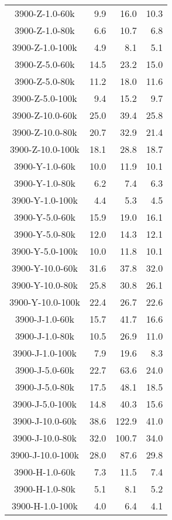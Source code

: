 \begin{longtable}{crrr}
    3900-Z-1.0-60k &   9.9 &   16.0 &  10.3 \\
    3900-Z-1.0-80k &   6.6 &   10.7 &   6.8 \\
    3900-Z-1.0-100k &   4.9 &    8.1 &   5.1 \\
    3900-Z-5.0-60k &  14.5 &   23.2 &  15.0 \\
    3900-Z-5.0-80k &  11.2 &   18.0 &  11.6 \\
    3900-Z-5.0-100k &   9.4 &   15.2 &   9.7 \\
    3900-Z-10.0-60k &  25.0 &   39.4 &  25.8 \\
    3900-Z-10.0-80k &  20.7 &   32.9 &  21.4 \\
    3900-Z-10.0-100k &  18.1 &   28.8 &  18.7 \\
    3900-Y-1.0-60k &  10.0 &   11.9 &  10.1 \\
    3900-Y-1.0-80k &   6.2 &    7.4 &   6.3 \\
    3900-Y-1.0-100k &   4.4 &    5.3 &   4.5 \\
    3900-Y-5.0-60k &  15.9 &   19.0 &  16.1 \\
    3900-Y-5.0-80k &  12.0 &   14.3 &  12.1 \\
    3900-Y-5.0-100k &  10.0 &   11.8 &  10.1 \\
    3900-Y-10.0-60k &  31.6 &   37.8 &  32.0 \\
    3900-Y-10.0-80k &  25.8 &   30.8 &  26.1 \\
    3900-Y-10.0-100k &  22.4 &   26.7 &  22.6 \\
    3900-J-1.0-60k &  15.7 &   41.7 &  16.6 \\
    3900-J-1.0-80k &  10.5 &   26.9 &  11.0 \\
    3900-J-1.0-100k &   7.9 &   19.6 &   8.3 \\
    3900-J-5.0-60k &  22.7 &   63.6 &  24.0 \\
    3900-J-5.0-80k &  17.5 &   48.1 &  18.5 \\
    3900-J-5.0-100k &  14.8 &   40.3 &  15.6 \\
    3900-J-10.0-60k &  38.6 &  122.9 &  41.0 \\
    3900-J-10.0-80k &  32.0 &  100.7 &  34.0 \\
    3900-J-10.0-100k &  28.0 &   87.6 &  29.8 \\
    3900-H-1.0-60k &   7.3 &   11.5 &   7.4 \\
    3900-H-1.0-80k &   5.1 &    8.1 &   5.2 \\
    3900-H-1.0-100k &   4.0 &    6.4 &   4.1 \\

\end{longtable}
